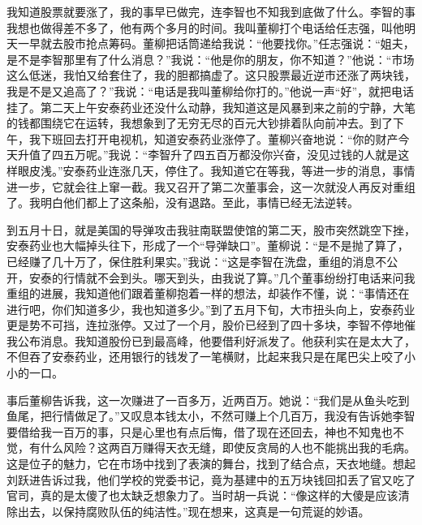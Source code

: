\documentclass[12pt,oneside]{book}
\begin{document}
我知道股票就要涨了，我的事早已做完，连李智也不知我到底做了什么。李智的事我想也做得差不多了，他有两个多月的时间。我叫董柳打个电话给任志强，叫他明天一早就去股市抢点筹码。董柳把话筒递给我说：``他要找你。''任志强说：``姐夫，是不是李智那里有了什么消息？''我说：``他是你的朋友，你不知道？''他说：``市场这么低迷，我怕又给套住了，我的胆都搞虚了。这只股票最近逆市还涨了两块钱，我是不是又追高了？''我说：``电话是我叫董柳给你打的。''他说一声``好''，就把电话挂了。第二天上午安泰药业还没什么动静，我知道这是风暴到来之前的宁静，大笔的钱都围绕它在运转，我想象到了无穷无尽的百元大钞排着队向前冲去。到了下午，我下班回去打开电视机，知道安泰药业涨停了。董柳兴奋地说：``你的财产今天升值了四五万呢。''我说：``李智升了四五百万都没你兴奋，没见过钱的人就是这样眼皮浅。''安泰药业连涨几天，停住了。我知道它在等我，等进一步的消息，事情进一步，它就会往上窜一截。我又召开了第二次董事会，这一次就没人再反对重组了。我明白他们都上了这条船，没有退路。至此，事情已经无法逆转。

到五月十日，就是美国的导弹攻击我驻南联盟使馆的第二天，股市突然跳空下挫，安泰药业也大幅掉头往下，形成了一个``导弹缺口''。董柳说：``是不是抛了算了，已经赚了几十万了，保住胜利果实。''我说：``这是李智在洗盘，重组的消息不公开，安泰的行情就不会到头。哪天到头，由我说了算。''几个董事纷纷打电话来问我重组的进展，我知道他们跟着董柳抱着一样的想法，却装作不懂，说：``事情还在进行吧，你们知道多少，我也知道多少。''到了五月下旬，大市扭头向上，安泰药业更是势不可挡，连拉涨停。又过了一个月，股价已经到了四十多块，李智不停地催我公布消息。我知道股份已到最高峰，他要借利好派发了。他获利实在是太大了，不但吞了安泰药业，还用银行的钱发了一笔横财，比起来我只是在尾巴尖上咬了小小的一口。

事后董柳告诉我，这一次赚进了一百多万，近两百万。她说：``我们是从鱼头吃到鱼尾，把行情做足了。''又叹息本钱太小，不然可赚上个几百万，我没有告诉她李智要借给我一百万的事，只是心里也有点后悔，借了现在还回去，神也不知鬼也不觉，有什么风险？这两百万赚得天衣无缝，即使反贪局的人也不能挑出我的毛病。这是位子的魅力，它在市场中找到了表演的舞台，找到了结合点，天衣地缝。想起刘跃进告诉过我，他们学校的党委书记，竟为基建中的五万块钱回扣丢了官又吃了官司，真的是太傻了也太缺乏想象力了。当时胡一兵说：``像这样的大傻是应该清除出去，以保持腐败队伍的纯洁性。''现在想来，这真是一句荒诞的妙语。
\end{document}
